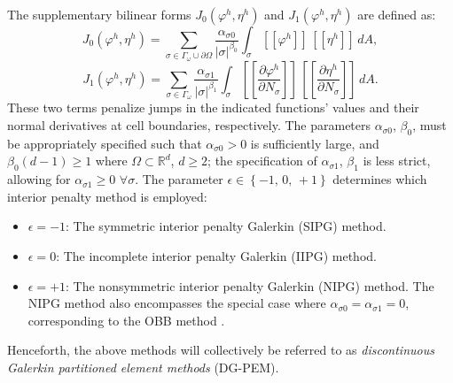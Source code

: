 	The supplementary bilinear forms $J_0 (\varphi^h,\eta^h)$ and $J_1 (\varphi^h,\eta^h)$ are defined as:
	\begin{equation}
		J_0 (\varphi^h,\eta^h) = \sum_{\sigma \in \Gamma_\omega \cup \partial \Omega} \frac{\alpha_{\sigma0}}{|\sigma|^{\beta_0}} \int_{\sigma} [\![ \varphi^h ]\!] \, [\![ \eta^h ]\!] \, dA,
	\end{equation}
	\begin{equation}
		J_1 (\varphi^h,\eta^h) = \sum_{\sigma \in \Gamma_\omega} \frac{\alpha_{\sigma1}}{|\sigma|^{\beta_1}} \int_{\sigma} \left[\!\!\left[ \frac{\partial \varphi^h}{\partial N_{\sigma}} \right]\!\!\right] \, \left[\!\!\left[ \frac{\partial \eta^h}{\partial N_{\sigma}} \right]\!\!\right] \, dA.
	\end{equation}
	These two terms penalize jumps in the indicated functions' values and their normal derivatives at cell boundaries, respectively. The parameters $\alpha_{\sigma0}$, $\beta_0$, must be appropriately specified such that $\alpha_{\sigma0} > 0$ is sufficiently large, and $\beta_0 (d-1) \geq 1$ where $\Omega \subset \mathbb{R}^d$, $d \geq 2$; the specification of $\alpha_{\sigma1}$, $\beta_1$ is less strict, allowing for $\alpha_{\sigma1} \geq 0 \, \, \forall \sigma$. The parameter $\epsilon \in \left\{ -1, \, 0, \, +1 \right\}$ determines which interior penalty method is employed:
	\begin{itemize}
		\item[] $\epsilon = -1$: The symmetric interior penalty Galerkin (SIPG) method.
		\item[] $\epsilon = 0$: The incomplete interior penalty Galerkin (IIPG) method.
		\item[] $\epsilon = +1$: The nonsymmetric interior penalty Galerkin (NIPG) method. The NIPG method also encompasses the special case where $\alpha_{\sigma0} = \alpha_{\sigma1} = 0$, corresponding to the OBB method \cite{Oden:98}.
	\end{itemize}
	Henceforth, the above methods will collectively be referred to as \textit{discontinuous Galerkin partitioned element methods} (DG-PEM).
	
